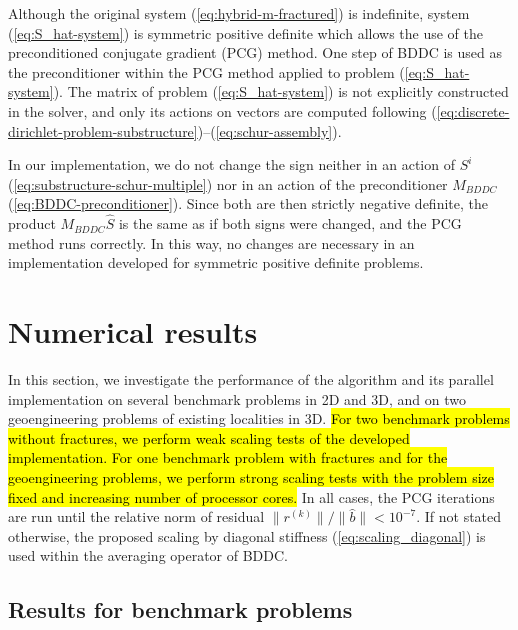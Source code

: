 Although the original system (\ref{eq:hybrid-m-fractured}) is indefinite,
system (\ref{eq:S_hat-system}) is symmetric positive definite which allows the
use of the preconditioned conjugate gradient (PCG) method. One step of BDDC is
used as the preconditioner within the PCG method applied to problem
(\ref{eq:S_hat-system}). The matrix of problem (\ref{eq:S_hat-system}) is not
explicitly constructed in the solver, and only its actions on vectors are
computed following (\ref{eq:discrete-dirichlet-problem-substructure})--(\ref{eq:schur-assembly}).

\begin{remark}
In our implementation, we do not change the sign neither in 
an action of $S^i$ (\ref{eq:substructure-schur-multiple}) nor in an action of  
the preconditioner $M_{BDDC}$ (\ref{eq:BDDC-preconditioner}).
Since both are then strictly negative definite, the product $M_{BDDC}\widehat{S}$ is 
the same as if both signs were changed, and the PCG method runs correctly.
In this way, no changes are necessary 
in an implementation developed for symmetric positive definite problems.
\end{remark}



\section{Numerical results}

\label{sec:numerical}

In this section, we investigate the performance of the algorithm and its
parallel implementation on several benchmark problems in 2D and 3D, and on two
geoengineering problems of existing localities in 3D. 
\hl{For two benchmark problems without fractures, 
we perform weak scaling tests of the developed implementation.
For one benchmark problem with fractures
and for the geoengineering problems, 
we perform strong scaling tests with the problem
size fixed and increasing number of processor cores.}
In all cases, the PCG
iterations are run until the relative norm of residual $\|r^{(k)}%
\|/\|\widehat{b}\| < 10^{-7}$. If not stated otherwise, the proposed scaling
by diagonal stiffness (\ref{eq:scaling_diagonal}) is used within the averaging
operator of BDDC.

\subsection{Results for benchmark problems}

